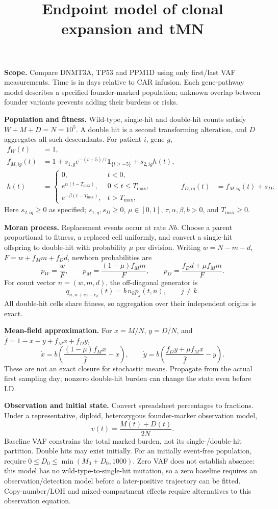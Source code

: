 \documentclass[10pt]{article}
\title{\vspace{-1.5em}Endpoint model of clonal expansion and tMN}
\author{}\date{}
\begin{document}
\maketitle\vspace{-2.8em}
\textbf{Scope.} Compare DNMT3A, TP53 and PPM1D using only first/last VAF measurements. Time is in days relative to CAR infusion. Each gene-pathway model describes a specified founder-marked population; unknown overlap between founder variants prevents adding their burdens or risks.

\textbf{Population and fitness.} Wild-type, single-hit and double-hit counts satisfy
\(W+M+D=N=10^5\). A double hit is a second transforming alteration, and \(D\) aggregates all such descendants. For patient \(i\), gene \(g\),
\begin{align}
 f_W(t)&=1, \\
 f_{M,ig}(t)&=1+s_{1,g}e^{-(t+5)/\tau}\mathbf1_{\{t\ge-5\}}+s_{2,ig}h(t),\\
 h(t)&=\begin{cases}
 0,&t<0,\\
 e^{\alpha(t-T_{\max})},&0\le t\le T_{\max},\\
 e^{-\beta(t-T_{\max})},&t>T_{\max},
 \end{cases}
 & f_{D,ig}(t)&=f_{M,ig}(t)+s_D .
\end{align}
Here \(s_{2,ig}\ge0\) as specified; \(s_{1,g},s_D\ge0\), \(\mu\in[0,1]\), \(\tau,\alpha,\beta,b>0\), and \(T_{\max}\ge0\).

\textbf{Moran process.} Replacement events occur at rate \(Nb\). Choose a parent proportional to fitness, a replaced cell uniformly, and convert a single-hit offspring to double-hit with probability \(\mu\) per division. Writing \(w=N-m-d\), \(F=w+f_Mm+f_Dd\), newborn probabilities are
\[
p_W=\frac{w}{F},\qquad
p_M=\frac{(1-\mu)f_Mm}{F},\qquad
p_D=\frac{f_Dd+\mu f_Mm}{F}.
\]
For count vector \(n=(w,m,d)\), the off-diagonal generator is
\[
q_{n,n+e_j-e_k}(t)=b\,n_kp_j(t,n),\qquad j\ne k.
\]
All double-hit cells share fitness, so aggregation over their independent origins is exact.

\textbf{Mean-field approximation.} For \(x=M/N\), \(y=D/N\), and
\(\bar f=1-x-y+f_Mx+f_Dy\),
\[
\dot x=b\left(\frac{(1-\mu)f_Mx}{\bar f}-x\right),\qquad
\dot y=b\left(\frac{f_Dy+\mu f_Mx}{\bar f}-y\right).
\]
These are not an exact closure for stochastic means. Propagate from the actual first sampling day; nonzero double-hit burden can change the state even before LD.

\textbf{Observation and initial state.} Convert spreadsheet percentages to fractions. Under a representative, diploid, heterozygous founder-marker observation model,
\[
v(t)=\frac{M(t)+D(t)}{2N}.
\]
Baseline VAF constrains the total marked burden, not its single-/double-hit partition. Double hits may exist initially. For an initially event-free population, require \(0\le D_0\le\min(M_0+D_0,1000)\). Zero VAF does not establish absence: this model has no wild-type-to-single-hit mutation, so a zero baseline requires an observation/detection model before a later-positive trajectory can be fitted. Copy-number/LOH and mixed-compartment effects require alternatives to this observation equation.
\end{document}
